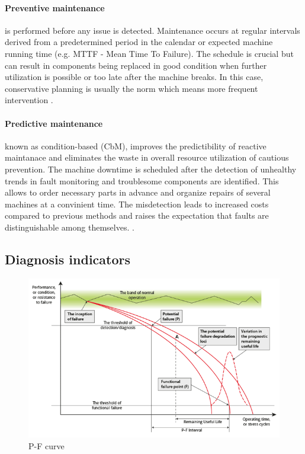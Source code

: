 \paragraph{Preventive maintenance} is performed before any issue is detected. Maintenance occurs at regular intervals derived from a predetermined period in the calendar or expected machine running time (e.g. MTTF - Mean Time To Failure). The schedule is crucial but can result in components being replaced in good condition when further utilization is possible or too late after the machine breaks. In this case, conservative planning is usually the norm which means more frequent intervention \cite{mohanty_machinery_2015}.  


\paragraph{Predictive maintenance} known as condition-based (CbM), improves the predictibility of reactive maintanace and eliminates the waste in overall resource utilization of cautious prevention. The machine downtime is scheduled after the detection of unhealthy trends in fault monitoring and troublesome components are identified. This allows to order necessary parts in advance and organize repairs of several machines at a convinient time. The misdetection leads to increased costs compared to previous methods and raises the expectation that faults are distinguishable among themselves. \cite{davies_handbook_2012}.

\subsection{Diagnosis indicators}
\begin{figure}[h]
\centering
\includegraphics[width=\textwidth]{assets/P-F-Curve.png}
\caption{P-F curve \cite{jennions_integrated_2011}}
\end{figure}

